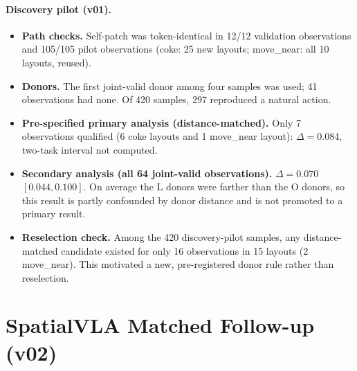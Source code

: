 \paragraph{Discovery pilot (v01).}
\begin{itemize}
\item \textbf{Path checks.} Self-patch was token-identical in 12/12 validation observations and 105/105 pilot observations (coke: 25 new layouts; move\_near: all 10 layouts, reused).
\item \textbf{Donors.} The first joint-valid donor among four samples was used; 41 observations had none. Of 420 samples, 297 reproduced a natural action.
\item \textbf{Pre-specified primary analysis (distance-matched).} Only 7 observations qualified (6 coke layouts and 1 move\_near layout): $\Delta=0.084$, two-task interval not computed.
\item \textbf{Secondary analysis (all 64 joint-valid observations).} $\Delta=0.070$ $[0.044,0.100]$. On average the L donors were farther than the O donors, so this result is partly confounded by donor distance and is not promoted to a primary result.
\item \textbf{Reselection check.} Among the 420 discovery-pilot samples, any distance-matched candidate existed for only 16 observations in 15 layouts (2 move\_near). This motivated a new, pre-registered donor rule rather than reselection.
\end{itemize}

\section{SpatialVLA Matched Follow-up (v02)}
\label{sec:svla2}
